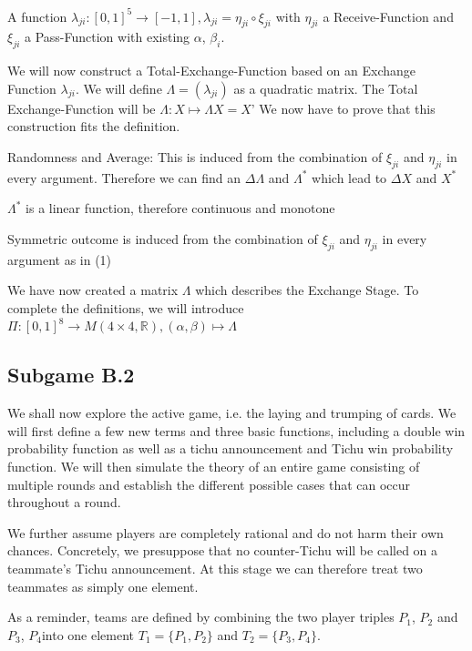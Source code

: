 \begin{definition}
A function $\lambda_{ji}: [0,1]^5 \to [-1,1], \lambda_{ji} = \eta_{ji} \circ \xi_{ji}$ with $\eta_{ji}$ a Receive-Function and $\xi_{ji}$ a Pass-Function with existing $\alpha$, $\beta_i$.
\end{definition}
\begin{remark}[Construction]
We will now construct a Total-Exchange-Function based on an Exchange Function $\lambda_{ji}$. We will define $\Lambda = (\lambda_{ji})$ as a quadratic matrix. 
The Total Exchange-Function will be $\Lambda: X \mapsto \Lambda X = X’$
We now have to prove that this construction fits the definition.
\begin{axioms}[(1)]
\item Randomness and Average: This is induced from the combination of $\xi_{ji}$ and $\eta_{ji}$ in every argument. Therefore we can find an $\Delta \Lambda$ and $\Lambda^* $ which lead to $\Delta X $ and 
$X^*$
\item $\Lambda^*$ is a linear function, therefore continuous and monotone
\item Symmetric outcome is induced from the combination of $\xi_{ji}$ and $\eta_{ji}$ in every argument as in (1)
\end{axioms}
We have now created a matrix $\Lambda$ which describes the Exchange Stage. To complete the definitions, we will introduce $ \Pi : [0,1]^8 \to M(4 \times 4, \mathbb{R}), (\alpha, \beta) \mapsto \Lambda $
\end{remark}

\subsection{Subgame B.2}
We shall now explore the active game, i.e. the laying and trumping of cards. We will first define a few new terms and three basic functions, including a double win probability function as well as a tichu announcement and Tichu win probability function. We will then simulate the theory of an entire game consisting of multiple rounds and establish the different possible cases that can occur throughout a round.

We further assume players are completely rational and do not harm their own chances. Concretely, we presuppose that no counter-Tichu will be called on a teammate’s Tichu announcement. At this stage we can therefore treat two teammates as simply one element.

As a reminder, teams are defined by combining the two player triples $P_1$, $P_2$ and $P_3$, $P_4$into one element $T_1 = \{P_1,P_2\}$ and $T_2 = \{P_3,P_4\}$.

